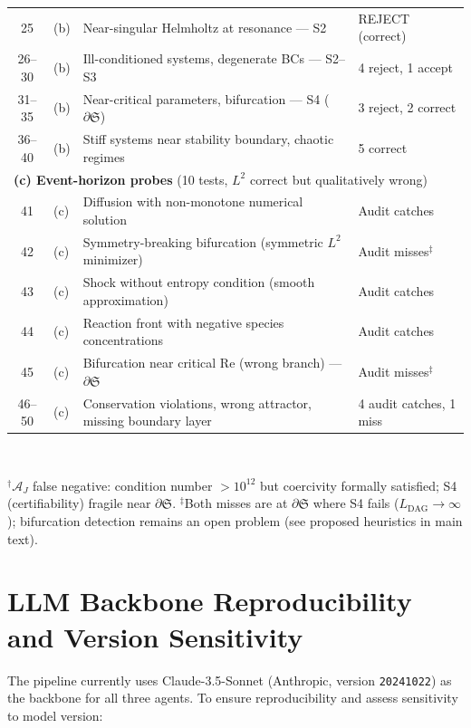 \documentclass[11pt,a4paper]{article}
\newcommand{\Sclass}{\mathfrak{S}}
\newcommand{\Agent}{\mathcal{A}}
\begin{document}
\begin{table}[htbp]
\begin{tabularx}{\textwidth}{clXl}
25 & (b) & Near-singular Helmholtz at resonance --- S2 & REJECT (correct) \\
26--30 & (b) & Ill-conditioned systems, degenerate BCs --- S2--S3 & 4 reject, 1 accept \\
31--35 & (b) & Near-critical parameters, bifurcation --- S4 ($\partial \Sclass$) & 3 reject, 2 correct \\
36--40 & (b) & Stiff systems near stability boundary, chaotic regimes & 5 correct \\
\midrule
\multicolumn{4}{l}{\textbf{(c) Event-horizon probes} (10 tests, $L^2$ correct but qualitatively wrong)} \\
41 & (c) & Diffusion with non-monotone numerical solution & Audit catches \\
42 & (c) & Symmetry-breaking bifurcation (symmetric $L^2$ minimizer) & Audit misses$^\ddagger$ \\
43 & (c) & Shock without entropy condition (smooth approximation) & Audit catches \\
44 & (c) & Reaction front with negative species concentrations & Audit catches \\
45 & (c) & Bifurcation near critical Re (wrong branch) --- $\partial \Sclass$ & Audit misses$^\ddagger$ \\
46--50 & (c) & Conservation violations, wrong attractor, missing boundary layer & 4 audit catches, 1 miss \\
\bottomrule
\end{tabularx}\\[3pt]
\raggedright\scriptsize $^\dagger$$\Agent_J$ false negative: condition number $> 10^{12}$ but coercivity formally satisfied; S4 (certifiability) fragile near $\partial \Sclass$. $^\ddagger$Both misses are at $\partial \Sclass$ where S4 fails ($L_{\text{DAG}} \to \infty$); bifurcation detection remains an open problem (see proposed heuristics in main text).
\end{table}

\section{LLM Backbone Reproducibility and Version Sensitivity}
\label{sec:s7}

The pipeline currently uses Claude-3.5-Sonnet (Anthropic, version \texttt{20241022}) as the backbone for all three agents. To ensure reproducibility and assess sensitivity to model version:
\end{document}
